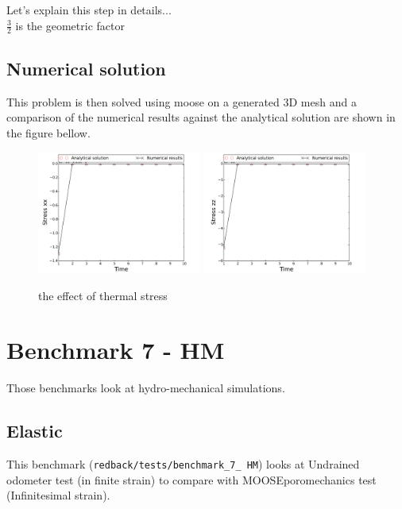 \documentclass[]{scrreprt}
\newcommand{\moose}{{MOOSE}}
\begin{document}
\ifshowallderivations
	Let's explain this step in details...\\
	$\frac{3}{2}$ is the geometric factor
\fi
\subsection{Numerical solution}
This problem is then solved using moose on a generated 3D mesh and a comparison of the numerical results against the analytical solution are shown in the figure bellow.
\begin{figure}
\label{fig:benchmark6_TM_elastic}
  \centering
  \includegraphics[width=0.48\textwidth]{benchmark_6_TM/benchmark_6_TM_bench_TM_elastic_stress_xx}
  \includegraphics[width=0.48\textwidth]{benchmark_6_TM/benchmark_6_TM_bench_TM_elastic_stress_zz}\\
  \caption{the effect of thermal stress }
 \end{figure}

\section{Benchmark 7 - HM}
Those benchmarks look at hydro-mechanical simulations.

\subsection{Elastic}
 This benchmark (\texttt{redback/tests/benchmark\_7\_ HM}) looks at Undrained odometer test (in finite strain) to compare with \moose poromechanics test (Infinitesimal strain).
\end{document}
